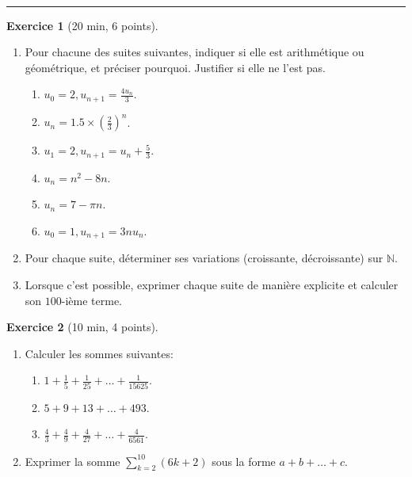 \documentclass{exam}
\theoremstyle{definition}
\newtheorem{exercice}{Exercice}
\begin{document}
\Large



~\\



\medskip\hrule

\begin{exercice}[20 min, 6 points]
    \begin{enumerate}
        \item Pour chacune des suites suivantes, indiquer si elle est arithmétique ou géométrique, et préciser pourquoi. Justifier si elle ne l’est pas.
        \begin{enumerate}
            \item $u_0 = 2, u_{n+1} = \frac{4 u_n}{3}$.
            \item $u_n = 1.5 \times (\frac{2}{3})^n$.
            \item $u_1 = 2, u_{n+1} = u_n + \frac{5}{3}$.
            \item $u_n = n^2 - 8n$.
            \item $u_n = 7 - \pi n$.
            \item $u_0 = 1, u_{n+1} = 3nu_n$.
        \end{enumerate}
        \item Pour chaque suite, déterminer ses variations (croissante, décroissante) sur $\mathbb{N}$.
        \item Lorsque c'est possible, exprimer chaque suite de manière explicite et calculer son $100$-ième terme.
    \end{enumerate}
\end{exercice}

\vfill

\begin{exercice}[10 min, 4 points]
\begin{enumerate}
    \item Calculer les sommes suivantes:
    \begin{enumerate}
        \item $1+\frac{1}{5}+\frac{1}{25}+\dots+\frac{1}{15625}$.
        \item $5+9+13+\dots+493$.
        \item $\frac{4}{3}+\frac{4}{9}+\frac{4}{27}+\dots+\frac{4}{6561}$.
    \end{enumerate}
    \item Exprimer la somme $\sum_{k=2}^{10}(6k+2)$ sous la forme $a+b+\dots+c$.
\end{enumerate}

\vfill
    
\end{exercice}
\end{document}
